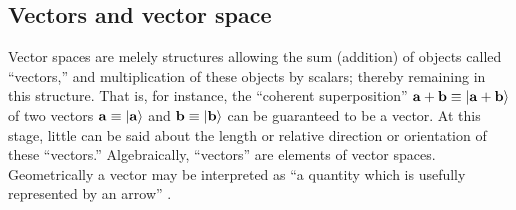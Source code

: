 \subsection{Vectors and vector space}

Vector spaces are melely structures allowing the
sum (addition) of objects called ``vectors,'' and multiplication
of these objects by scalars; thereby remaining in this structure.
That is, for instance, the ``coherent superposition''  ${\bf a} + {\bf b}\equiv \vert {\bf a} + {\bf b} \rangle $
of two vectors ${\bf a} \equiv \vert {\bf a} \rangle $ and ${\bf b} \equiv \vert {\bf b} \rangle $ can be guaranteed to
be a vector.
At this stage, little can be said about the length or relative direction or orientation of these ``vectors.''
Algebraically, ``vectors'' are elements of vector spaces.
Geometrically a vector may be interpreted as ``a quantity which is usefully represented by an arrow'' \cite{Weinreich}.



